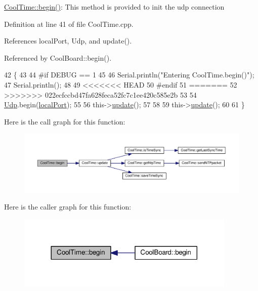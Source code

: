 \hyperlink{classCoolTime_ab1976cf718b950bc31e003c3323b8adb}{Cool\+Time\+::begin()}\+: This method is provided to init the udp connection 

Definition at line 41 of file Cool\+Time.\+cpp.



References local\+Port, Udp, and update().



Referenced by Cool\+Board\+::begin().


\begin{DoxyCode}
42 \{
43 
44 \textcolor{preprocessor}{#if DEBUG == 1 }
45 
46     Serial.println(\textcolor{stringliteral}{"Entering CoolTime.begin()"});
47     Serial.println();
48 
49 <<<<<<< HEAD
50 \textcolor{preprocessor}{#endif }
51 =======
52 >>>>>>> 022ecfccbd47fa628feca52fc7c1ee420c585e2b
53 
54     \hyperlink{classCoolTime_a4e23216a8121ca79d0fb019f30884b92}{Udp}.begin(\hyperlink{classCoolTime_a2f777da44d7ba678be8185299e9b49d1}{localPort});
55 
56     this->\hyperlink{classCoolTime_aae601f795452cfa48d9fb337aed483a8}{update}();
57 
58     
59     this->\hyperlink{classCoolTime_aae601f795452cfa48d9fb337aed483a8}{update}();
60     
61 \}
\end{DoxyCode}
Here is the call graph for this function\+:
\nopagebreak
\begin{figure}[H]
\begin{center}
\leavevmode
\includegraphics[width=350pt]{classCoolTime_ab1976cf718b950bc31e003c3323b8adb_cgraph}
\end{center}
\end{figure}
Here is the caller graph for this function\+:
\nopagebreak
\begin{figure}[H]
\begin{center}
\leavevmode
\includegraphics[width=296pt]{classCoolTime_ab1976cf718b950bc31e003c3323b8adb_icgraph}
\end{center}
\end{figure}
\mbox{\label{classCoolTime_a87c28260c1bc77091162cbcf1ee2e129}} 
